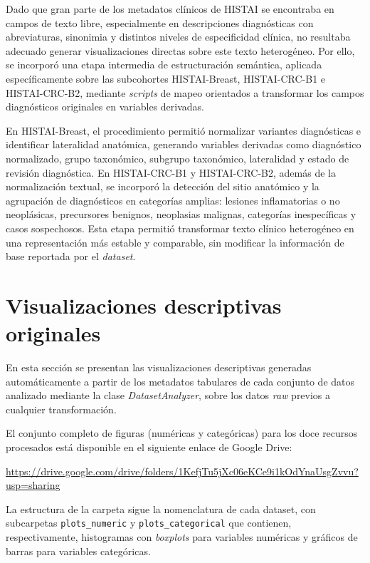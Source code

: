 Dado que gran parte de los metadatos clínicos de HISTAI se encontraba en campos de texto libre, especialmente en descripciones diagnósticas con abreviaturas, sinonimia y distintos niveles de especificidad clínica, no resultaba adecuado generar visualizaciones directas sobre este texto heterogéneo. Por ello, se incorporó una etapa intermedia de estructuración semántica, aplicada específicamente sobre las subcohortes HISTAI-Breast, HISTAI-CRC-B1 e HISTAI-CRC-B2, mediante \textit{scripts} de mapeo orientados a transformar los campos diagnósticos originales en variables derivadas.

En HISTAI-Breast, el procedimiento permitió normalizar variantes diagnósticas e identificar lateralidad anatómica, generando variables derivadas como diagnóstico normalizado, grupo taxonómico, subgrupo taxonómico, lateralidad y estado de revisión diagnóstica. En HISTAI-CRC-B1 y HISTAI-CRC-B2, además de la normalización textual, se incorporó la detección del sitio anatómico y la agrupación de diagnósticos en categorías amplias: lesiones inflamatorias o no neoplásicas, precursores benignos, neoplasias malignas, categorías inespecíficas y casos sospechosos. Esta etapa permitió transformar texto clínico heterogéneo en una representación más estable y comparable, sin modificar la información de base reportada por el \textit{dataset}.

\section{Visualizaciones descriptivas originales}
\label{sec:app_c_visualizaciones_originales}

En esta sección se presentan las visualizaciones descriptivas generadas automáticamente a partir de los metadatos tabulares de cada conjunto de datos analizado mediante la clase \textit{DatasetAnalyzer}, sobre los datos \textit{raw} previos a cualquier transformación.

El conjunto completo de figuras (numéricas y categóricas) para los doce recursos procesados está disponible en el siguiente enlace de Google Drive:

\medskip
\centerline{\url{https://drive.google.com/drive/folders/1KefjTu5jXc06eKCe9i1kOdYnaUsgZvvu?usp=sharing}}
\medskip

La estructura de la carpeta sigue la nomenclatura de cada dataset, con subcarpetas \texttt{plots\_numeric} y \texttt{plots\_categorical} que contienen, respectivamente, histogramas con \textit{boxplots} para variables numéricas y gráficos de barras para variables categóricas.

